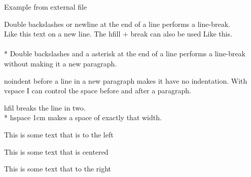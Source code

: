 \documentclass[a4paper, 10pt, english]{extarticle}
\begin{document}
\begin{listing}[H]
\inputminted{python}{test_code.py}
\caption{Example from external file}
\label{listing:2}
\end{listing}

\noindent
Double backslashes or newline at the end of a line performs a line-break. \\ Like this text on a new line. The hfill + break can also be used \hfill \break Like this.
\\
\\*
Double backslashes and a asterisk at the end of a line performs a line-break without making it a new paragraph. %

\vspace*{50px}
\noindent
noindent before a line in a new paragraph makes it have no indentation.
With vspace I can control the space before and after a paragraph.
\vspace{20px}

\noindent hfil breaks the line \hfil in two. \\*
hspace 1cm makes a space \hspace{1cm} of exactly that width.

\begin{flushleft}
  This is some text that is to the left 
\end{flushleft}

\begin{center}
  This is some text that is centered 
\end{center}

\begin{flushright}
  This is some text that to the right 
\end{flushright}
\end{document}
